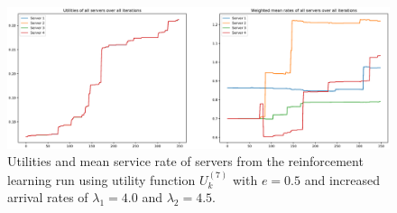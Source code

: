 \begin{figure}[H]
    \includegraphics[width=\textwidth]{chapters/00_appendix/03_more_rl_results/Bin/utility_7_eps/u7_6_e05_Lambda_85.eps}
    \caption{Utilities and mean service rate of servers from the reinforcement
    learning run using utility function \(U_k^{(7)}\) with \(e = 0.5\) and
    increased arrival rates of \(\lambda_1 = 4.0\) and \(\lambda_2 = 4.5\).}
    \label{fig:RL_utility7_6_e05_Lambda_85}
\end{figure}